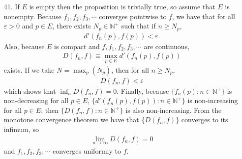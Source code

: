 \documentclass[a4paper,12pt]{article}
\begin{document}
\begin{enumerate}
        \item[41.]
            If $E$ is empty then the proposition is trivially true, so assume that $E$ is nonempty. Because $f_1, f_2, f_3, \cdots$ converges pointwise to $f$, we have that for all $\varepsilon > 0$ and $p \in E$, there exists $N_p \in \mathbb{N}^+$ such that if $n \geq N_p$,
            \begin{align*}
                d'(f_n(p), f(p)) < \varepsilon.
            \end{align*}
            Also, because $E$ is compact and $f, f_1, f_2, f_3, \cdots$ are continuous,
            \begin{align*}
                D(f_n, f) \equiv \max_{p \in E} d'(f_n(p), f(p))
            \end{align*}
            exists. If we take $N = \max_p (N_p)$, then for all $n \geq N_p$,
            \begin{align*}
                D(f_n, f) < \varepsilon
            \end{align*}
            which shows that $\inf_n D(f_n, f) = 0$. Finally, because $\{ f_n(p) : n \in \mathbb{N}^+ \}$ is non-decreasing for all $p \in E$, $\{ d'(f_n(p), f(p)) : n \in \mathbb{N}^+ \}$ is non-increasing for all $p \in E$; then $\{ D(f_n, f) : n \in \mathbb{N}^+ \}$ is also non-increasing. From the monotone convergence theorem we have that $\{ D(f_n, f) \}$ converges to its infimum, so
            \begin{align*}
                \lim_{n \to \infty} D(f_n, f) = 0
            \end{align*}
            and $f_1, f_2, f_3, \cdots$ converges uniformly to $f$.
    \end{enumerate}
\end{document}
